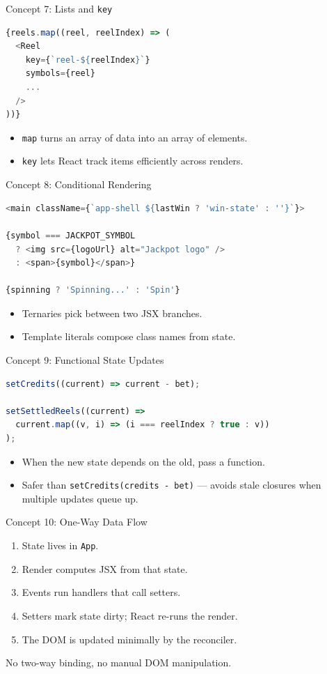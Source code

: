 \documentclass{beamer}
\begin{document}
\begin{frame}[fragile]{Concept 7: Lists and \texttt{key}}
\begin{lstlisting}[language=JavaScript]
{reels.map((reel, reelIndex) => (
  <Reel
    key={`reel-${reelIndex}`}
    symbols={reel}
    ...
  />
))}
\end{lstlisting}
  \begin{itemize}
    \item \texttt{map} turns an array of data into an array of elements.
    \item \texttt{key} lets React track items efficiently across renders.
  \end{itemize}
\end{frame}

\begin{frame}[fragile]{Concept 8: Conditional Rendering}
\begin{lstlisting}[language=JavaScript]
<main className={`app-shell ${lastWin ? 'win-state' : ''}`}>

{symbol === JACKPOT_SYMBOL
  ? <img src={logoUrl} alt="Jackpot logo" />
  : <span>{symbol}</span>}

{spinning ? 'Spinning...' : 'Spin'}
\end{lstlisting}
  \begin{itemize}
    \item Ternaries pick between two JSX branches.
    \item Template literals compose class names from state.
  \end{itemize}
\end{frame}

\begin{frame}[fragile]{Concept 9: Functional State Updates}
\begin{lstlisting}[language=JavaScript]
setCredits((current) => current - bet);

setSettledReels((current) =>
  current.map((v, i) => (i === reelIndex ? true : v))
);
\end{lstlisting}
  \begin{itemize}
    \item When the new state depends on the old, pass a function.
    \item Safer than \texttt{setCredits(credits - bet)} --- avoids stale closures when multiple updates queue up.
  \end{itemize}
\end{frame}

\begin{frame}{Concept 10: One-Way Data Flow}
  \begin{enumerate}
    \item State lives in \texttt{App}.
    \item Render computes JSX from that state.
    \item Events run handlers that call setters.
    \item Setters mark state dirty; React re-runs the render.
    \item The DOM is updated minimally by the reconciler.
  \end{enumerate}
  \vfill
  No two-way binding, no manual DOM manipulation.
\end{frame}
\end{document}
